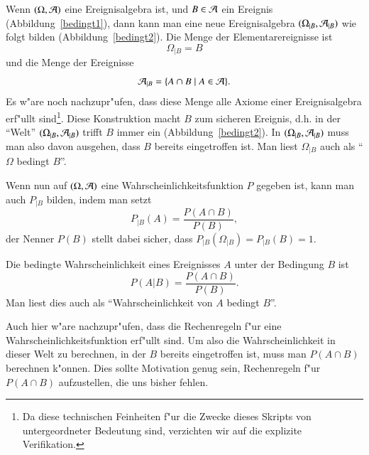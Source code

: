 Wenn $(\Omega, {\cal A})$ eine Ereignisalgebra ist, und 
$B\in{\cal A}$ ein Ereignis (Abbildung~\ref{bedingt1}),
dann kann man eine neue Ereignisalgebra
$(\Omega_{|B}, {\cal A}_{|B})$ wie folgt bilden (Abbildung~\ref{bedingt2}).
Die Menge der Elementarereignisse ist
\[
\Omega_{|B}=B
\]
und die Menge der Ereignisse
\[
{\cal A}_{|B}=\{A\cap B\;|\; A\in{\cal A}\}.
\]
Es w"are noch nachzupr"ufen, dass diese Menge alle Axiome einer
Ereignisalgebra erf"ullt sind\footnote{Da diese technischen Feinheiten 
f"ur die Zwecke dieses Skripts von untergeordneter Bedeutung sind, verzichten
wir auf die explizite Verifikation.}.
Diese Konstruktion macht $B$ zum sicheren Ereignis, d.h. in der ``Welt''
$(\Omega_{|B},{\cal A}_{|B})$ trifft $B$ immer ein (Abbildung~\ref{bedingt2}).
In $(\Omega_{|B},{\cal A}_{|B})$ muss man also davon ausgehen, dass $B$
bereits eingetroffen ist.
Man liest $\Omega_{|B}$ auch als ``$\Omega$ bedingt $B$''.

Wenn nun auf $(\Omega, {\cal A})$ eine Wahrscheinlichkeitsfunktion $P$
gegeben ist, kann man auch $P_{|B}$ bilden, indem man setzt
\begin{equation*}
P_{|B}(A)=\frac{P(A\cap B)}{P(B)},
\end{equation*}
der Nenner $P(B)$ stellt dabei sicher, dass $P_{|B}(\Omega_{|B})=P_{|B}(B)=1$.

\begin{definition}
\label{def-bedingte-wahrscheinlichkeit}
Die bedingte Wahrscheinlichkeit eines Ereignisses $A$ unter der Bedingung
$B$ ist
\[
P(A|B)=\frac{P(A\cap B)}{P(B)}.
\]
Man liest dies auch als ``Wahrscheinlichkeit von $A$ bedingt $B$''.
\end{definition}

Auch hier w"are nachzupr"ufen, dass die Rechenregeln f"ur eine
Wahrscheinlichkeitsfunktion erf"ullt sind.
Um also die Wahrscheinlichkeit in dieser Welt zu berechnen,
in der $B$ bereits eingetroffen ist, 
muss man $P(A\cap B)$ berechnen k"onnen.
Dies sollte Motivation genug sein, Rechenregeln f"ur
$P(A\cap B)$ aufzustellen, die uns bisher fehlen.

